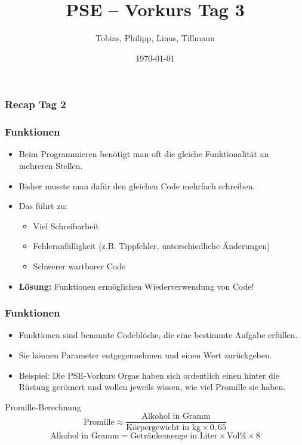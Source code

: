\documentclass{../../presentation}
\title{PSE – Vorkurs Tag 3}
\author{Tobias, Philipp, Linus, Tillmann}
\institute{FIUS - Fachgruppe Informatik Universität Stuttgart}
\date{\today}
\begin{document}
\begin{frame}
    \titlepage
\end{frame}

\begin{frame}
    \listoftodos
\end{frame}

\begin{frame}
    \frametitle{Recap Tag 2}
\end{frame}

\begin{frame}[fragile]
    \frametitle{Funktionen}
    \begin{itemize}
        \item Beim Programmieren benötigt man oft die gleiche Funktionalität an mehreren Stellen.
        \item Bisher musste man dafür den gleichen Code mehrfach schreiben.
        \item Das führt zu:
              \begin{itemize}
                  \item Viel Schreibarbeit
                  \item Fehleranfälligkeit (z.B. Tippfehler, unterschiedliche Änderungen)
                  \item Schwerer wartbarer Code
              \end{itemize}
        \item \textbf{Lösung:} Funktionen ermöglichen Wiederverwendung von Code!
    \end{itemize}
\end{frame}

\begin{frame}
    \frametitle{Funktionen}
    \begin{itemize}
        \item Funktionen sind benannte Codeblöcke, die eine bestimmte Aufgabe erfüllen.
        \item Sie können Parameter entgegennehmen und einen Wert zurückgeben.
        \item Beispiel: Die PSE-Vorkurs Orgas haben sich ordentlich einen hinter die Rüstung gerömert und wollen jeweils wissen, wie viel Promille sie haben.
    \end{itemize}
    \begin{block}{Promille-Berechnung}
        \[
            \text{Promille} \approx \frac{\text{Alkohol in Gramm}}{\text{Körpergewicht in kg} \times 0{,}65}
        \]
        \[
            \text{Alkohol in Gramm} = \text{Getränkemenge in Liter} \times \text{Vol\%} \times 8
        \]
    \end{block}
\end{frame}
\end{document}
